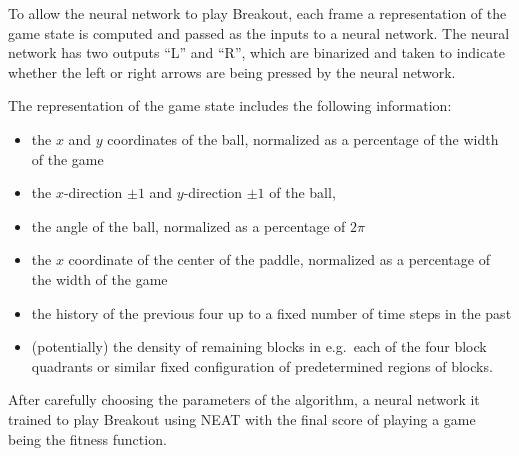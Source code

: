 \documentclass[letterpaper, twocolumn, conference]{article}
\begin{document}
To allow the neural network to play Breakout,
each frame a representation of the game state is computed and
passed as the inputs to a neural network.
The neural network has two outputs ``L'' and ``R'', which are binarized
and taken to indicate whether the left or right arrows are being pressed by the neural network.

The representation of the game state includes the following information:
\begin{itemize}
    \item{} the $x$ and $y$ coordinates of the ball, normalized as a percentage of the width of the game
    \item{} the $x$-direction $\pm1$ and $y$-direction $\pm 1$ of the ball,
    \item{} the angle of the ball, normalized as a percentage of $2\pi$
    \item{} the $x$ coordinate of the center of the paddle, normalized as a percentage of the width of the game
    \item{} the history of the previous four up to a fixed number of time steps in the past
    \item{} (potentially) the density of remaining blocks in e.g.\ each of the four block quadrants or similar fixed configuration of predetermined regions of blocks.
\end{itemize}

After carefully choosing the parameters of the algorithm, a neural network
it trained to play Breakout using NEAT with the final score of playing a game being the fitness function.
\end{document}
